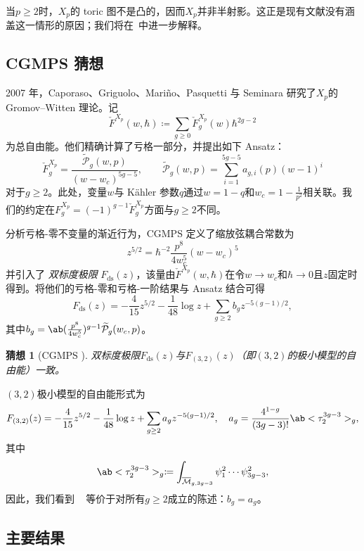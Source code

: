 \documentclass{amsart}
\newtheorem{conj}[thm]{猜想}
\theoremstyle{definition}
\theoremstyle{remark}
\theoremstyle{plain}
\theoremstyle{definition}
\theoremstyle{remark}
\newcommand{\Mbar}{\overline{\mathcal{M}}}
\newcommand{\mc}[1]{\mathcal{#1}}
\newcommand{\mr}[1]{\mathrm{#1}}
\newcommand{\wt}[1]{\widetilde{#1}}
\newcommand{\1}{\mathbf{1}}
\newcommand{\2}{\mathbf{2}}
\newcommand{\3}{\mathbf{3}}
\begin{document}
当\(p \geq 2\)时，\(X_p\)的 toric 图不是凸的，因而\(X_p\)并非半射影。这正是现有文献没有涵盖这一情形的原因；我们将在~中进一步解释。

\subsection{CGMPS 猜想}%
\label{sub:The conjecture of CGMPS}

2007 年，Caporaso、Griguolo、Mari\~{n}o、Pasquetti 与 Seminara 研究了\(X_p\)的 Gromov--Witten 理论。记
\[ \check{F}^{X_p}(w,\hbar) \coloneqq \sum_{g \geq 0} \check{F}_g^{X_p}(w) \hbar^{2g-2} \]
为总自由能。他们精确计算了亏格一部分，并提出如下 Ansatz：
\begin{equation}\label{eqn:cgmps ansatz}
    \check{F}_g^{X_p} = \frac{\wt{\mc{P}}_g(w,p)}{(w-w_c)^{5g-5}}, \qquad \wt{\mc{P}}_g(w,p) = \sum_{i=1}^{5g-5} a_{g,i}(p)(w-1)^i
\end{equation}
对于\(g \geq 2\)。此处，变量\(w\)与 Kähler 参数\(q\)通过\(w = 1-q\)和\(w_c = 1 - \frac{1}{p^2}\)相关联。我们的约定在\(F_g^{X_p} = (-1)^{g-1}\check{F}_g^{X_p}\)方面与\(g \geq 2\)不同。

分析亏格-零不变量的渐近行为，CGMPS 定义了缩放弦耦合常数为
\[ z^{5/2} = \hbar^{-2} \frac{p^8}{4w_c^5}(w-w_c)^5 \]
并引入了 \textit{双标度极限} \(F_{\mr{ds}}(z)\)，该量由\(\check{F}^{X_p}(w,\hbar)\)在令\(w \to w_c\)和\(\hbar \to 0\)且\(z\)固定时得到。将他们的亏格-零和亏格-一阶结果与 Ansatz 结合可得
\[ F_{\mr{ds}}(z) = -\frac{4}{15}z^{5/2} - \frac{1}{48}\log z + \sum_{g \geq 2} b_g z^{-5(g-1)/2}, \]
其中\(b_g = \ab(\frac{p^8}{4w_c^5})^{g-1}\wt{\mc{P}}_g(w_c,p)\)。

\begin{conj}[CGMPS {\cite{CGMPS2007}}]%
\label{conj:cgmps}
    双标度极限\(F_{\mr{ds}}(z)\)与\(F_{(3,2)}(z)\)（即\((3,2)\)的极小模型的自由能）一致。
\end{conj}

\((3,2)\)极小模型的自由能形式为
\[ F_{(3,2)}(z) = -\frac{4}{15}z^{5/2} - \frac{1}{48}\log z + \sum_{g\geq2} a_g z^{-5(g-1)/2}, \quad a_g = \frac{4^{1-g}}{(3g-3)!}\ab<\tau_2^{3g-3}>_g, \]
其中
\[ \ab<\tau_2^{3g-3}>_g \coloneqq \int_{\Mbar_{g,3g-3}} \psi_1^2 \cdots \psi_{3g-3}^2, \]
因此，我们看到 ~ 等价于对所有\(g \geq 2\)成立的陈述：\(b_g = a_g\)。

\subsection{主要结果}%
\label{sub:The main results (Guo local P1)}
\end{document}
